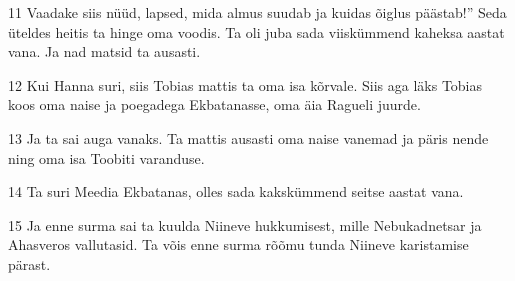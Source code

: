 \par 11 Vaadake siis nüüd, lapsed, mida almus suudab ja kuidas õiglus  päästab!” Seda üteldes heitis ta hinge oma voodis. Ta oli juba  sada viiskümmend kaheksa aastat vana. Ja nad matsid ta ausasti.
\par 12 Kui Hanna suri, siis Tobias mattis ta oma isa kõrvale. Siis  aga läks Tobias koos oma naise ja poegadega Ekbatanasse, oma äia  Ragueli juurde.
\par 13 Ja ta sai auga vanaks. Ta mattis ausasti oma naise vanemad ja  päris nende ning oma isa Toobiti varanduse.
\par 14 Ta suri Meedia Ekbatanas, olles sada kakskümmend seitse aastat  vana.
\par 15 Ja enne surma sai ta kuulda Niineve hukkumisest, mille  Nebukadnetsar ja Ahasveros vallutasid. Ta võis enne surma rõõmu tunda  Niineve karistamise pärast. 


